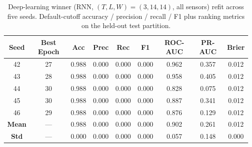\begin{table}[t]
\centering
\small
\caption{Deep-learning winner (RNN, $(T,L,W)=(3,14,14)$, all sensors) refit across five seeds.  Default-cutoff accuracy / precision / recall / F1 plus ranking metrics on the held-out test partition.}\label{tab:v2_dl_seeds}
\begin{tabular}{ccccccccc}
\toprule
Seed & Best Epoch & Acc & Prec & Rec & F1 & ROC-AUC & PR-AUC & Brier \\
\midrule
42 & 27 & 0.988 & 0.000 & 0.000 & 0.000 & 0.962 & 0.357 & 0.012 \\
43 & 28 & 0.988 & 0.000 & 0.000 & 0.000 & 0.958 & 0.405 & 0.012 \\
44 & 30 & 0.988 & 0.000 & 0.000 & 0.000 & 0.828 & 0.075 & 0.012 \\
45 & 30 & 0.988 & 0.000 & 0.000 & 0.000 & 0.887 & 0.341 & 0.012 \\
46 & 29 & 0.988 & 0.000 & 0.000 & 0.000 & 0.876 & 0.129 & 0.012 \\
\midrule
\textbf{Mean} & --- & 0.988 & 0.000 & 0.000 & 0.000 & 0.902 & 0.261 & 0.012 \\
\textbf{Std} & --- & 0.000 & 0.000 & 0.000 & 0.000 & 0.057 & 0.148 & 0.000 \\
\bottomrule
\end{tabular}
\end{table}
